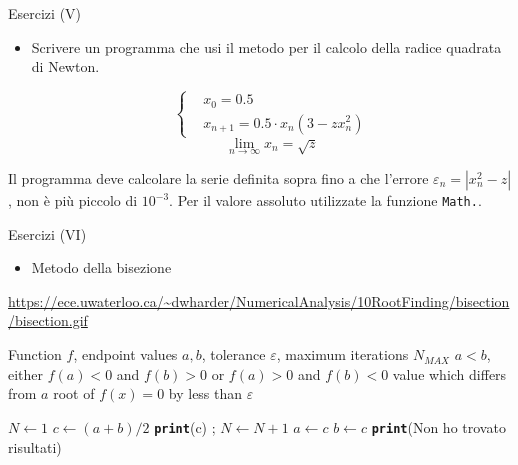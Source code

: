 \begin{frame}{Esercizi (V)}
  \begin{itemize}
    \item Scrivere un programma che usi il metodo per il calcolo della radice quadrata di Newton.
    
    \begin{equation*}
      \left\{\begin{aligned}
	  & x_0 = 0.5\\
	  & x_{n +1} = 0.5 \cdot {x_n} (3  - zx^2_n)
      \end{aligned}\right.
    \end{equation*}
    \begin{equation*}
     \lim_{n \to \infty} x_{n} = \sqrt{z}
    \end{equation*}
  \end{itemize}
  
  Il programma deve calcolare la serie definita sopra fino a che l'errore $\varepsilon_{n} = |x^{2}_{n} - z|$,
  non è più piccolo di $10^{-3}$. Per il valore assoluto utilizzate la funzione \texttt{Math.}.

\end{frame}

\begin{frame}{Esercizi (VI)}
  \begin{itemize}
    \item Metodo della bisezione
  \end{itemize}
  \begin{tiny}
    \url{https://ece.uwaterloo.ca/~dwharder/NumericalAnalysis/10RootFinding/bisection/bisection.gif}
  \end{tiny}

  \begin{scriptsize}
    \begin{center}
      \begin{minipage}{8cm}
	\begin{algorithmic}[1]
	  \Require Function $f$, endpoint values $a, b$, tolerance $\varepsilon$, maximum iterations $N_{MAX}$
		   $a < b$, either $f(a) < 0$ and $f(b) > 0$ or $f(a) > 0$ and $f(b) < 0$
	  \Ensure value which differs from $a$ root of $f(x)=0$ by less than $\varepsilon$
    
	  \State $N \gets 1$
	    \State $c \gets (a + b)/2$
	      \State \texttt{\textbf{print}}(c)
	      \State \Return;
	    \EndIf
	    \State $N \gets N + 1$
	      \State $a \gets c$
	    \Else 
	      \State $b \gets c$
	    \EndIf
	  \EndWhile
	  \State \texttt{\textbf{print}}(Non ho trovato risultati)
	\end{algorithmic}
      \end{minipage}
    \end{center}
  \end{scriptsize}

\end{frame}

